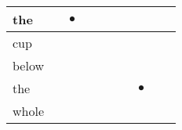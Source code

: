 \documentclass[landscape]{article}
\newcommand{\ssp}{\hspace{2pt}}
\newcommand{\mex}{\cellcolor{g}$\bullet$}
\begin{document}
\begin{tabular}{|l|p{10pt}|p{10pt}|p{10pt}|p{10pt}|p{10pt}|p{10pt}|p{10pt}|p{10pt}|p{10pt}|}
\hline
\ssp \cellcolor{ref1}the \ssp&\hspace{2pt}&\hspace{2pt}\mex&\hspace{2pt}&\hspace{2pt}&\hspace{2pt}&\hspace{2pt}&\hspace{2pt}&\hspace{2pt}&\hspace{2pt}\\
\hline
\ssp cup \ssp&\hspace{2pt}&\hspace{2pt}&\hspace{2pt}&\hspace{2pt}&\hspace{2pt}&\hspace{2pt}&\hspace{2pt}&\hspace{2pt}&\hspace{2pt}\\
\hline
\ssp below \ssp&\hspace{2pt}&\hspace{2pt}&\hspace{2pt}&\hspace{2pt}&\hspace{2pt}&\hspace{2pt}&\hspace{2pt}&\hspace{2pt}&\hspace{2pt}\\
\hline
\ssp \cellcolor{ref6}the \ssp&\hspace{2pt}&\hspace{2pt}&\hspace{2pt}&\hspace{2pt}&\hspace{2pt}&\hspace{2pt}&\hspace{2pt}\mex&\hspace{2pt}&\hspace{2pt}\\
\hline
\ssp whole \ssp&\hspace{2pt}&\hspace{2pt}&\hspace{2pt}&\hspace{2pt}&\hspace{2pt}&\hspace{2pt}&\hspace{2pt}&\hspace{2pt}&\hspace{2pt}\\

\end{tabular}
\end{document}
